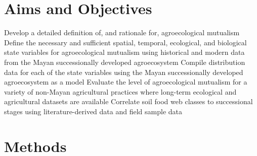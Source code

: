 \section{Aims and Objectives}
\begin{outline}[enumerate]
\1 Develop a detailed definition of, and rationale for, agroecological mutualism
\1 Define the necessary and sufficient spatial, temporal, ecological, and biological state variables for agroecological mutualism using historical and modern data from the Mayan successionally developed agroecosystem
\1 Compile distribution data for each of the state variables using the Mayan successionally developed agroecosystem as a model
\1 Evaluate the level of agroecological mutualism for a variety of non-Mayan agricultural practices where long-term ecological and agricultural datasets are available
\1 Correlate soil food web classes to successional stages using literature-derived data and field sample data
\end{outline}

\section{Methods}
